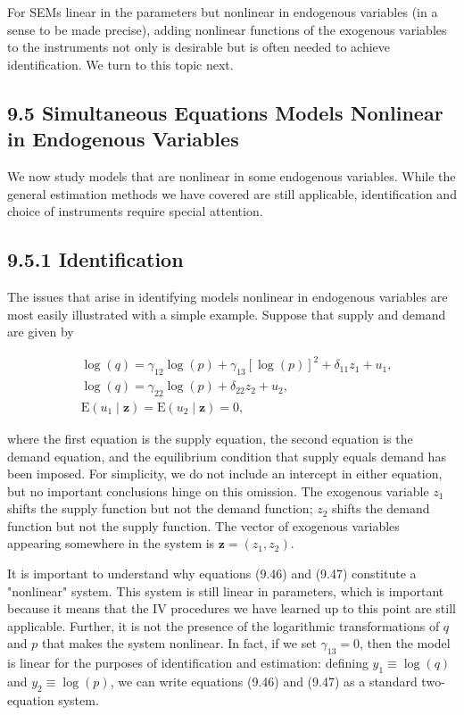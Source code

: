 \documentclass[10pt]{article}
\begin{document}
For SEMs linear in the parameters but nonlinear in endogenous variables (in a sense to be made precise), adding nonlinear functions of the exogenous variables to the instruments not only is desirable but is often needed to achieve identification. We turn to this topic next.

\subsection*{9.5 Simultaneous Equations Models Nonlinear in Endogenous Variables}
We now study models that are nonlinear in some endogenous variables. While the general estimation methods we have covered are still applicable, identification and choice of instruments require special attention.

\subsection*{9.5.1 Identification}
The issues that arise in identifying models nonlinear in endogenous variables are most easily illustrated with a simple example. Suppose that supply and demand are given by


\begin{align*}
& \log (q)=\gamma_{12} \log (p)+\gamma_{13}[\log (p)]^{2}+\delta_{11} z_{1}+u_{1},  \tag{9.46}\\
& \log (q)=\gamma_{22} \log (p)+\delta_{22} z_{2}+u_{2},  \tag{9.47}\\
& \mathrm{E}\left(u_{1} \mid \mathbf{z}\right)=\mathrm{E}\left(u_{2} \mid \mathbf{z}\right)=0, \tag{9.48}
\end{align*}


where the first equation is the supply equation, the second equation is the demand equation, and the equilibrium condition that supply equals demand has been imposed. For simplicity, we do not include an intercept in either equation, but no important conclusions hinge on this omission. The exogenous variable $z_{1}$ shifts the supply function but not the demand function; $z_{2}$ shifts the demand function but not the supply function. The vector of exogenous variables appearing somewhere in the system is $\mathbf{z}=\left(z_{1}, z_{2}\right)$.

It is important to understand why equations (9.46) and (9.47) constitute a "nonlinear" system. This system is still linear in parameters, which is important because it means that the IV procedures we have learned up to this point are still applicable. Further, it is not the presence of the logarithmic transformations of $q$ and $p$ that makes the system nonlinear. In fact, if we set $\gamma_{13}=0$, then the model is linear for the purposes of identification and estimation: defining $y_{1} \equiv \log (q)$ and $y_{2} \equiv \log (p)$, we can write equations (9.46) and (9.47) as a standard two-equation system.
\end{document}
